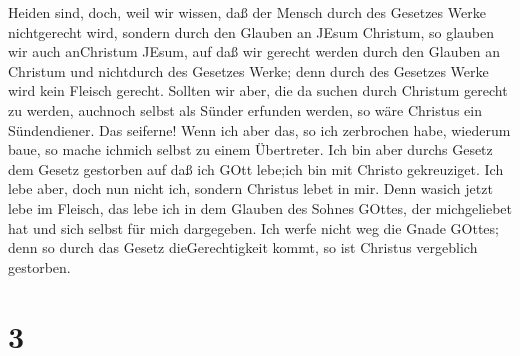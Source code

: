 Heiden sind,  doch, weil wir wissen, daß der Mensch durch
des Gesetzes Werke nichtgerecht wird, sondern durch den Glauben an JEsum
Christum, so glauben wir auch anChristum JEsum, auf daß wir gerecht
werden durch den Glauben an Christum und nichtdurch des Gesetzes Werke;
denn durch des Gesetzes Werke wird kein Fleisch gerecht. 
Sollten wir aber, die da suchen durch Christum gerecht zu werden,
auchnoch selbst als Sünder erfunden werden, so wäre Christus ein
Sündendiener. Das seiferne!  Wenn ich aber das, so ich
zerbrochen habe, wiederum baue, so mache ichmich selbst zu einem
Übertreter.  Ich bin aber durchs Gesetz dem Gesetz
gestorben auf daß ich GOtt lebe;ich bin mit Christo gekreuziget.
 Ich lebe aber, doch nun nicht ich, sondern Christus lebet
in mir. Denn wasich jetzt lebe im Fleisch, das lebe ich in dem Glauben
des Sohnes GOttes, der michgeliebet hat und sich selbst für mich
dargegeben.  Ich werfe nicht weg die Gnade GOttes; denn so
durch das Gesetz dieGerechtigkeit kommt, so ist Christus vergeblich
gestorben.

\hypertarget{section-1}{%
\section{3}\label{section-1}}

